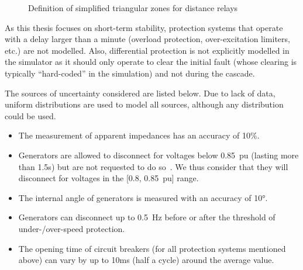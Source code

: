\begin{figure}
    \centering
    \caption{Definition of simplified triangular zones for distance relays}
    \label{fig:zones}
\end{figure}

As this thesis focuses on short-term stability, protection systems that operate with a delay larger than a minute (overload protection, over-excitation limiters, etc.) are not modelled. Also, differential protection is not explicitly modelled in the simulator as it should only operate to clear the initial fault (whose clearing is typically ``hard-coded'' in the simulation) and not during the cascade.

The sources of uncertainty considered are listed below. Due to lack of data, uniform distributions are used to model all sources, although any distribution could be used.

\begin{itemize}
    \item The measurement of apparent impedances has an accuracy of 10\%.
    \item Generators are allowed to disconnect for voltages below 0.85~pu (lasting more than 1.5s) but are not requested to do so~\cite{ENTSOEgeneratorRequirements}. We thus consider that they will disconnect for voltages in the [0.8, 0.85~pu] range.
	\item The internal angle of generators is measured with an accuracy of 10°.
	\item Generators can disconnect up to 0.5~Hz before or after the threshold of under-/over-speed protection.
	\item The opening time of circuit breakers (for all protection systems mentioned above) can vary by up to 10ms (half a cycle) around the average value.
\end{itemize}

